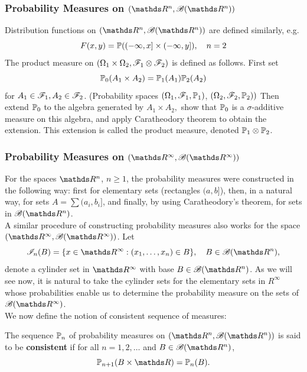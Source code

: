 \subsubsection{Probability Measures on $(\R^n, \B(\R^n))$}

Distribution functions on $(\R^n, \B(\R^n))$ are defined similarly, e.g.
\begin{equation*}
    F(x,y) = \mathbb{P}((-\infty, x] \times (-\infty, y]), \quad n=2
\end{equation*}
The product measure on $(\Omega_1 \times \Omega_2, \mathcal{F}_1 \otimes \mathcal{F}_2)$ is defined as follows. First set $$\mathbb{P}_0(A_1 \times A_2) = \mathbb{P}_1(A_1)\mathbb{P}_2(A_2)$$ for $A_1 \in \mathcal{F}_1, A_2 \in \mathcal{F}_2$. (Probability spaces $(\Omega_1, \mathcal{F}_1, \mathbb{P}_1)$, $(\Omega_2, \mathcal{F}_2, \mathbb{P}_2))$ Then extend $\mathbb{P}_0$ to the algebra generated by $A_1 \times A_2,$ show that $\mathbb{P}_0$ is a $\sigma$-additive measure on this algebra, and apply Caratheodory theorem to obtain the extension. This extension is called the product measure, denoted $\mathbb{P}_1 \otimes \mathbb{P}_2$.\\

\subsubsection{Probability Measures on $(\R^\infty, \B(\R^\infty))$}
For the spaces $\R^n$, $n \ge 1$, the probability measures were constructed in the following way: first for elementary sets (rectangles $(a, b]$), then, in a natural way, for sets $A = \sum (a_i, b_i]$, and finally, by using Caratheodory’s theorem, for sets in $\B(\R^n)$.\\

A similar procedure of constructing probability measures also works for the space $(\R^\infty, \B(\R^\infty))$. Let
\begin{equation*}
    \mathcal{I}_n(B) = \{ x \in \R^\infty : (x_1, \dots, x_n) \in B\}, \quad B \in \B(\R^n),
\end{equation*}
denote a cylinder set in $\R^\infty$ with base $B \in \B(\R^n)$. As we will see now, it is natural to take the cylinder sets for the elementary sets in $R^\infty$ whose probabilities enable us to determine the probability measure on the sets of $\B(\R^\infty)$.\\

We now define the notion of consistent sequence of measures:

\begin{definition} \label{def:consistent_sequence}
The sequence $\mathbb{P}_n$ of probability measures on $(\R^n, \B(\R^n))$ is said to be \textbf{consistent} if for all $n = 1,2, \dots$ and $B \in \B(\R^n)$,
\begin{equation*}
    \p_{n+1}(B \times \R) = \p_n (B).
\end{equation*}
\end{definition}

